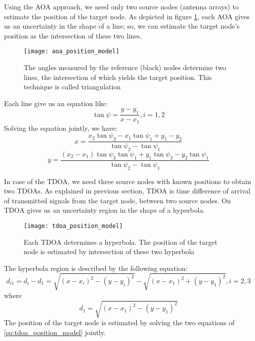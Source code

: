 \documentclass[../templatetop.tex]{subfiles}
\begin{document}
Using the AOA approach, we need only two source nodes (antenna arrays) to estimate the position of the target node. As depicted in figure \ref{fig:aoa_position_model}, each AOA gives us an uncertainty in the shape of a line; so, we can estimate the target node's position as the intersection of these two lines.

\begin{figure}[htbp]
    \centering
    \texttt{[image: aoa\_position\_model]}
    \caption{The angles measured by the reference (black) nodes determine two lines, the intersection of
    which yields the target position. This technique is called triangulation}
    \label{fig:aoa_position_model}
\end{figure}

Each line give us an equation like:
\begin{equation}
    \tan{\psi} = \frac{y-y_1}{x-x_1}, i = 1,2
\end{equation}
Solving the equation jointly, we have:
\begin{equation}
    x = \frac{x_2\tan{\psi_2} - x_1\tan{\psi_1} + y_1 - y_2}{\tan{\psi_2} - \tan{\psi_1}}
\end{equation}
\begin{equation}
    y = \frac{(x_2-x_1)\tan{\psi_2}\tan{\psi_1} + y_1\tan{\psi_2} - y_2\tan{\psi_1}}{\tan{\psi_2}-\tan{\psi_1}}
\end{equation}

In case of the TDOA, we need three source nodes with known positions to obtain two TDOAs. As explained in previous section, TDOA is time difference of arrival of transmitted signals from the target node, between two source nodes. On TDOA gives us an uncertainty region in the shape of a hyperbola.

\begin{figure}[htbp]
    \centering
    \texttt{[image: tdoa\_position\_model]}
    \caption{Each TDOA determines a hyperbola. The position of the target node is estimated by intersection of these two hyperbola}
    \label{fig:tdoa_position_model}
\end{figure}

The hyperbola region is described by the following equation:
\begin{equation}
    d_{i1} = d_i - d_1 = \sqrt{(x-x_i)^2 - (y-y_i)^2} - \sqrt{(x-x_1)^2+(y-y_1)^2}, i =2,3
    \label{eq:tdoa_position_model}
\end{equation}
where
\begin{equation}
    d_1 = \sqrt{(x-x_1)^2 - (y-y_1)^2}
\end{equation}
The position of the target node is estimated by solving the two equations of \ref{eq:tdoa_position_model} jointly.
\end{document}
